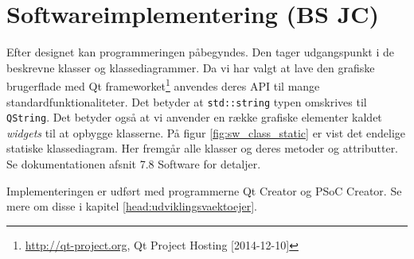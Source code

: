 \section{Softwareimplementering (BS JC)}\label{head:sw_impl}
Efter designet kan programmeringen påbegyndes. Den tager udgangspunkt i de beskrevne klasser og klassediagrammer.
Da vi har valgt at lave den grafiske brugerflade med Qt frameworket\footnote{\url{http://qt-project.org}, Qt Project Hosting [2014-12-10]} anvendes deres API til mange standardfunktionaliteter. Det betyder at \verb+std::string+ typen omskrives til \verb+QString+. 
Det betyder også at vi anvender en række grafiske elementer kaldet \textit{widgets} til at opbygge klasserne. På figur \ref{fig:sw_class_static} er vist det endelige statiske klassediagram. Her fremgår alle klasser og deres metoder og attributter.
Se dokumentationen afsnit 7.8 Software for detaljer.


Implementeringen er udført med programmerne Qt Creator og PSoC Creator. Se mere om disse i kapitel \ref{head:udviklingsvaektoejer}.

